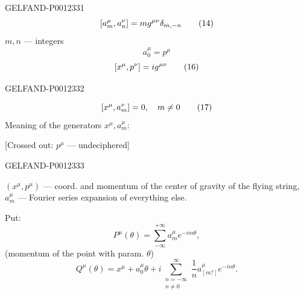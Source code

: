 \begin{GelfandAdjacentEvidence}{GELFAND-P001233}{1}
\begin{equation*}
\relax [a_m^\mu,a_n^\nu]=m g^{\mu\nu}\delta_{m,-n}\tag{14}
\end{equation*}
\(m,n\) --- integers
\begin{equation*}
a_0^\mu=p^\mu\tag{15}
\end{equation*}
\begin{equation*}
\relax [x^\mu,p^\nu]=i g^{\mu\nu}\tag{16}
\end{equation*}
\end{GelfandAdjacentEvidence}
\begin{GelfandAdjacentEvidence}{GELFAND-P001233}{2}

\begin{equation*}
\relax [x^\mu,a_m^\nu]=0,\quad m\ne0\tag{17}
\end{equation*}
Meaning of the generators \(x^\mu,a_m^\mu\):

[Crossed out: \(p^\mu\) --- undeciphered]
\end{GelfandAdjacentEvidence}
\begin{GelfandAdjacentEvidence}{GELFAND-P001233}{3}

\((x^\mu,p^\mu)\) --- coord. and momentum of the center of gravity of the flying string, \(a_m^\mu\) --- Fourier series expansion of everything else.

Put:
\begin{equation*}
P^\mu(\theta)=\sum_{-\infty}^{+\infty}a_m^\mu e^{-im\theta},\tag{18}
\end{equation*}
(momentum of the point with param. \(\theta\))
\begin{equation*}
Q^\mu(\theta)=x^\mu+a_0^\mu\theta+
 i\sum_{\substack{n=-\infty\\n\ne0}}^{\infty}\frac1n a_{[m?]}^\mu e^{-in\theta}.\tag{19}
\end{equation*}
\end{GelfandAdjacentEvidence}
